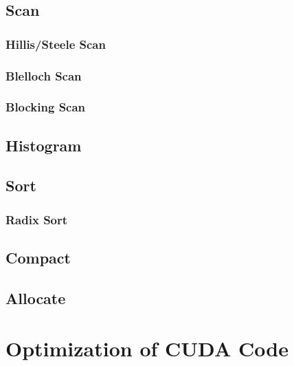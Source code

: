\documentclass[12px,oz]{report}
\theoremstyle{indented}
\theoremstyle{indented}
\begin{document}
	\section{Scan}
	\label{sec:al_scan}
	
	
		\subsection{Hillis/Steele Scan}
		\label{sec:al_scan_hillis_steele}
		
		
		\subsection{Blelloch Scan}
		\label{sec:al_scan_blelloch}
		
		
		\subsection{Blocking Scan}
		\label{sec:al_scan_blocking}
		
	
	\section{Histogram}
	\label{sec:al_histogram}
	
	
	\section{Sort}
	\label{sec:al_sort}
	
	
		\subsection{Radix Sort}
		\label{sec:al_sort_radix}
		

	\section{Compact}
	\label{sec-compact}
	
	
	\section{Allocate}
	\label{sec-allocate}
	
	
\chapter{Optimization of CUDA Code}
\label{ch-opti-intro}

\end{document}
